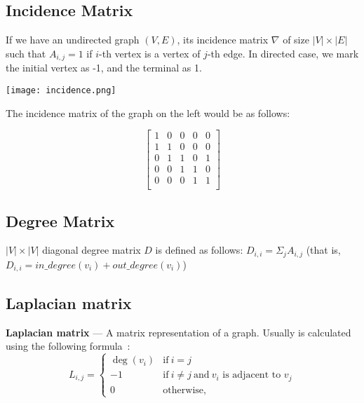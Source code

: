 \subsection*{Incidence Matrix}

    If we have an undirected graph $(V, E)$, its incidence matrix $\nabla$ of size $\lvert V \rvert \times \lvert E \rvert$ such that $A_{i, j} = 1$ if $i$-th vertex is a vertex of $j$-th edge.
    In directed case, we mark the initial vertex as -1, and the terminal as 1.

    \begin{multicols}{2}
        \texttt{[image: incidence.png]}

        The incidence matrix of the graph on the left would be as follows:

        \[
        \begin{bmatrix}
            1 & 0 & 0 & 0 & 0\\
            1 & 1 & 0 & 0 & 0\\
            0 & 1 & 1 & 0 & 1\\
            0 & 0 & 1 & 1 & 0\\
            0 & 0 & 0 & 1 & 1\\
        \end{bmatrix}
        \]

    \end{multicols}


\subsection*{Degree Matrix}

    $\lvert V \rvert \times \lvert V \rvert$ diagonal degree matrix $D$ is defined as follows: $D_{i,i} = \Sigma_j A_{i, j}$ (that is, $D_{i, i} = in\_degree(v_i) + out\_degree(v_i)$)


\subsection*{Laplacian matrix}

    \textbf{Laplacian matrix} --- A matrix representation of a graph.
    Usually is calculated using the following formula~\cite{wiki_laplacian}:
    \begin{equation*}
        L_{i, j} = 
        \begin{cases}
            \deg(v_i) & \mbox{if}\ i = j \\
            -1 & \mbox{if}\ i \neq j\ \mbox{and}\ v_i \mbox{ is adjacent to } v_j \\
            0 & \mbox{otherwise},
    \end{cases}
    \end{equation*}

